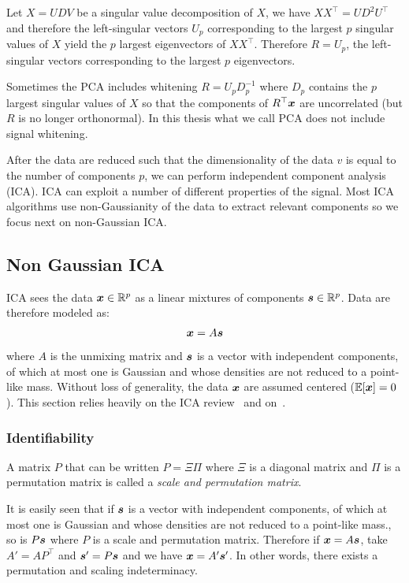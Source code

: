 Let $X = UDV$ be a singular value decomposition of $X$, we have $XX^{\top}= U
D^2 U^{\top}$ and therefore the left-singular vectors $U_p$ corresponding to the
largest $p$ singular values of $X$ yield  the $p$ largest eigenvectors of
$XX^{\top}$. Therefore $R=U_p$, the left-singular vectors corresponding
to the largest $p$ eigenvectors.

Sometimes the PCA includes whitening $R = U_p D_p^{-1}$ where $D_p$ contains the
 $p$ largest singular values of $X$ so that the components of $R^{\top} \boldsymbol{x}$ are
uncorrelated (but $R$ is no longer orthonormal). In this thesis what we call PCA
does not include signal whitening.

After the data are reduced such that the dimensionality of the data $v$ is equal to
the number of components $p$, we can perform independent component analysis (ICA).
ICA can exploit a number of different properties of the signal. Most ICA
algorithms use non-Gaussianity of the data to extract relevant components so we
focus next on non-Gaussian ICA.

\subsection{Non Gaussian ICA}
ICA sees the data $\boldsymbol{x} \in \mathbb{R}^p$ as a linear mixtures of components $\boldsymbol{s} \in \mathbb{R}^p$.
Data are therefore modeled as:
\begin{align}
  \boldsymbol{x} = A \boldsymbol{s}
\end{align}
where $A$ is the unmixing matrix and $\boldsymbol{s}$ is a vector with independent components, of which at most one is Gaussian and whose densities are not reduced to a point-like mass.
Without loss of generality, the data $\boldsymbol{x}$ are assumed centered ($\mathbb{E}[\boldsymbol{x}] = 0$).
This section relies heavily on the ICA review~\cite{hyvarinen2000independent}
and on~\cite{cardoso1997infomax}.

\subsubsection{Identifiability}
A matrix $P$ that can be written $P =
\Xi \Pi$ where $\Xi$ is a diagonal matrix and $\Pi$ is a permutation matrix
is called a \emph{scale and permutation matrix}.

It is easily seen that if $\boldsymbol{s}$ is a vector with independent components, of
which at most one is Gaussian and whose densities are not reduced to a
point-like mass., so is $P \boldsymbol{s}$ where $P$ is a scale and permutation matrix.
Therefore if $\boldsymbol{x} = A \boldsymbol{s}$, take $A' = AP^{\top}$ and $\boldsymbol{s}'=P\boldsymbol{s}$ and we have
$\boldsymbol{x} = A' \boldsymbol{s}'$.
In other words, there exists a permutation and scaling indeterminacy.

